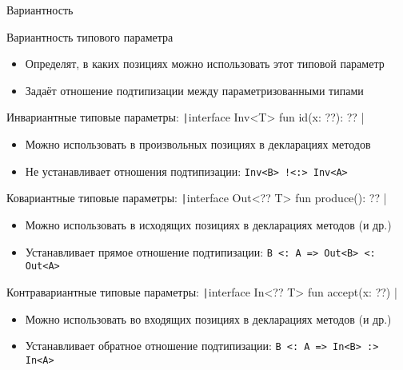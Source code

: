 \documentclass[handout,aspectratio=169,usenames,dvipsnames]{beamer}
\begin{document}
    \begin{frame}{Вариантность}
        \begin{block}{Вариантность типового параметра}
            \begin{itemize}
                \item Определят, в каких позициях можно использовать этот типовой параметр
                \item Задаёт отношение подтипизации между параметризованными типами
            \end{itemize}
        \end{block}
        \begin{block}{Инвариантные типовые параметры: \texttt|interface Inv<T> { fun id(x: ??): ?? }|}
            \begin{itemize}
                \item Можно использовать в произвольных позициях в декларациях методов
                \item Не устанавливает отношения подтипизации: \texttt{Inv<B> !<:> Inv<A>}
            \end{itemize}
        \end{block}
        \begin{block}{Ковариантные типовые параметры: \texttt|interface Out<?? T> { fun produce(): ?? }|}
            \begin{itemize}
                \item Можно использовать в исходящих позициях в декларациях методов (и др.)
                \item Устанавливает прямое отношение подтипизации: \texttt{B <: A => Out<B> <: Out<A>}
            \end{itemize}
        \end{block}
        \begin{block}{Контравариантные типовые параметры: \texttt|interface In<?? T> { fun accept(x: ??) }|}
            \begin{itemize}
                \item Можно использовать во входящих позициях в декларациях методов (и др.)
                \item Устанавливает обратное отношение подтипизации: \texttt{B <: A => In<B> :> In<A>}
            \end{itemize}
        \end{block}
    \end{frame}
\end{document}
